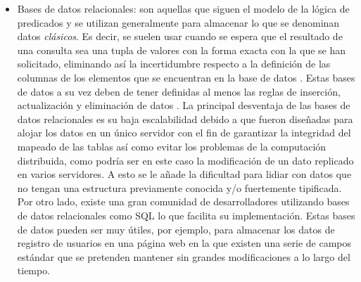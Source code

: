 \begin{itemize}

\item Bases de datos relacionales: son aquellas que siguen el modelo de la lógica de predicados y se utilizan generalmente para almacenar lo que se denominan datos \textit{clásicos}. Es decir, se suelen usar cuando se espera que el resultado de una consulta sea una tupla de valores con la forma exacta con la que se han solicitado, eliminando así la incertidumbre respecto a la definición de las columnas de los elementos que se encuentran en la base de datos \citep{jimenez2016implementacion}. Estas bases de datos a su vez deben de tener definidas al menos las reglas de inserción, actualización y eliminación de datos \citep{codd1979extending}. La principal desventaja de las bases de datos relacionales es su baja escalabilidad debido a que fueron diseñadas para alojar los datos en un único servidor con el fin de garantizar la integridad del mapeado de las tablas así como evitar los problemas de la computación distribuida, como podría ser en este caso la modificación de un dato replicado en varios servidores. A esto se le añade la dificultad para lidiar con datos que no tengan una estructura previamente conocida y/o fuertemente tipificada. Por otro lado, existe una gran comunidad de desarrolladores utilizando bases de datos relacionales como SQL lo que facilita su implementación. Estas bases de datos pueden ser muy útiles, por ejemplo, para almacenar los datos de registro de usuarios en una página web en la que existen una serie de campos estándar que se pretenden mantener sin grandes modificaciones a lo largo del tiempo.


\end{itemize}
